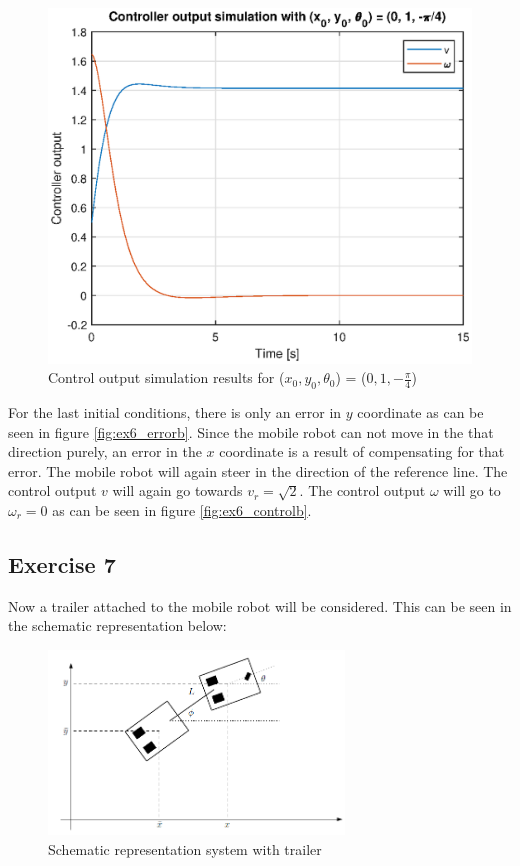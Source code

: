 \begin{figure}[H]
\begin{minipage}{0.5\textwidth}
    \includegraphics[width=\textwidth]{Problems/ex6_controlc.eps}
    \caption{Control output simulation results for ($x_0, y_0, \theta_0$) = ($0, 1, -\frac{\pi}{4}$)}
    \label{fig:ex6_controlc}
\end{minipage}
\end{figure}

For the last initial conditions, there is only an error in $y$ coordinate as can be seen in figure \ref{fig:ex6_errorb}. Since the mobile robot can not move in the that direction purely, an error in the $x$ coordinate is a result of compensating for that error. The mobile robot will again steer in the direction of the reference line. The control output $v$ will again go towards $v_r = \sqrt{2}$. The control output $\omega$ will go to $\omega_r = 0$ as can be seen in figure \ref{fig:ex6_controlb}.

\subsection{Exercise 7}

Now a trailer attached to the mobile robot will be considered. This can be seen in the schematic representation below:

\begin{figure}[H]
    \centering
    \includegraphics[width=0.7\textwidth]{Problems/ex7_schematic_system.PNG}
    \caption{Schematic representation system with trailer}
    \label{fig:ex7_schematics}
\end{figure}

